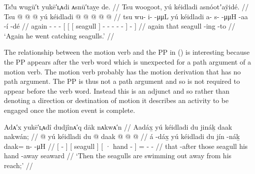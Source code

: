 \ex\label{ex:100-13-went-catching-again}%
%
\begingl
	\glpreamble	Ts!u wugū′t yukē′ʟ̣ᴀdi ᴀsnū′taỵe de. //
	\glpreamble	Tsu woogoot, yú kéidladi asnóotʼaÿidé. //
	\gla	Tsu  @ {} @ {} @ {}
			{} {} {} yú kéidladi {}
			 @ {} @ {} @ {} @ {} @ {} {} {} {} //
	\glb	tsu wu- i-  -μμL
			{} {} {} yú kéidladi {} 
			a- s-  -μμH -aa -í {} -dé //
	\glc	again - -  -
			{}[ {}[ {}[  seagull {}]
			- -  - - - {}] - {}] //
	\gld	again  {} {} {}
			{} {} {} that seagull {}
			 {} {} {} {} -ing {} -to{} //
	\glft	‘Again he went catching seagulls.’
		//
\endgl
\xe

The relationship between the motion verb and the PP in (\lastx) is interesting because the PP appears after the verb word which is unexpected for a path argument of a motion verb.
The motion verb probably has the motion derivation  that has no path argument.
The PP is thus not a path argument and so is not required to appear before the verb word.
Instead this is an adjunct and so rather than denoting a direction or destination of motion it describes an activity to be engaged once the motion event is complete.

\ex\label{ex:100-14-seagulls-swimming-out}%
%
\begingl
	\glpreamble	Adᴀ′x yukē′ʟ̣ᴀdî dudjînᴀ′q dāk nᴀkwᴀ′n //
	\glpreamble	Aadáx̱ yú kéidladi du jináḵ daak nakwán; //
	\gla	{}  @ {} {}
			{} yú kéidladi {}
			{} du  @ {} {}
			daak @  @ {} @ {} //
	\glb	{} á -dáx̱ {}
			{} yú kéidladi {}
			{} du jín -náḵ {}
			daak= n-  -μH //
	\glc	{}[  - {}]
			{}[  seagull {}]
			{}[ · hand - {}]
			= -  - //
	\gld	{} that -after {}
			{} those seagull {}
			{} his hand -away {}
			seaward  {} {} {} {} {} //
	\glft	‘Then the seagulls are swimming out away from his reach;’
		//
\endgl
\xe

